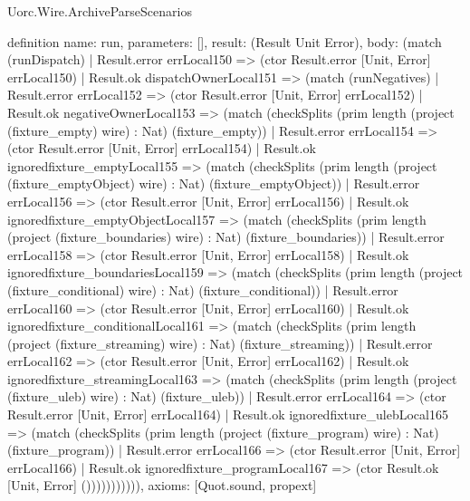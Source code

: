 \begin{lexlean}{Uorc.Wire.ArchiveParseScenarios}
\begin{semanticmodule}
definition{
  name: run,
  parameters: [],
  result: (Result Unit Error),
  body: (match (runDispatch)
    | Result.error errLocal150 => (ctor Result.error [Unit, Error] errLocal150)
    | Result.ok dispatchOwnerLocal151 => (match (runNegatives)
      | Result.error errLocal152 => (ctor Result.error [Unit, Error] errLocal152)
      | Result.ok negativeOwnerLocal153 => (match (checkSplits (prim length (project (fixture_empty) wire) : Nat) (fixture_empty))
        | Result.error errLocal154 => (ctor Result.error [Unit, Error] errLocal154)
        | Result.ok ignoredfixture_emptyLocal155 => (match (checkSplits (prim length (project (fixture_emptyObject) wire) : Nat) (fixture_emptyObject))
          | Result.error errLocal156 => (ctor Result.error [Unit, Error] errLocal156)
          | Result.ok ignoredfixture_emptyObjectLocal157 => (match (checkSplits (prim length (project (fixture_boundaries) wire) : Nat) (fixture_boundaries))
            | Result.error errLocal158 => (ctor Result.error [Unit, Error] errLocal158)
            | Result.ok ignoredfixture_boundariesLocal159 => (match (checkSplits (prim length (project (fixture_conditional) wire) : Nat) (fixture_conditional))
              | Result.error errLocal160 => (ctor Result.error [Unit, Error] errLocal160)
              | Result.ok ignoredfixture_conditionalLocal161 => (match (checkSplits (prim length (project (fixture_streaming) wire) : Nat) (fixture_streaming))
                | Result.error errLocal162 => (ctor Result.error [Unit, Error] errLocal162)
                | Result.ok ignoredfixture_streamingLocal163 => (match (checkSplits (prim length (project (fixture_uleb) wire) : Nat) (fixture_uleb))
                  | Result.error errLocal164 => (ctor Result.error [Unit, Error] errLocal164)
                  | Result.ok ignoredfixture_ulebLocal165 => (match (checkSplits (prim length (project (fixture_program) wire) : Nat) (fixture_program))
                    | Result.error errLocal166 => (ctor Result.error [Unit, Error] errLocal166)
                    | Result.ok ignoredfixture_programLocal167 => (ctor Result.ok [Unit, Error] ())))))))))),
  axioms: [Quot.sound, propext]
}
\end{semanticmodule}
\end{lexlean}
